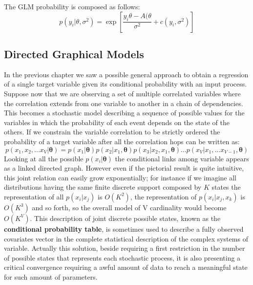 The GLM probability is composed as follows:
\begin{equation}
    p(y_i| \theta, \sigma^2) = 
    \exp{\left[ \frac{y_i\theta - A(\theta}{\sigma^2} + c(y_i,\sigma^2) \right] }
\end{equation}


%
%




\subsection{Directed Graphical Models}
In the previous chapter we saw a possible general approach to obtain a regression of a single target variable given its conditional probability with an input process. Suppose now that we are observing a set of multiple correlated variables where the correlation extends from one variable to another in a chain of dependencies. This becomes a stochastic model describing a sequence of possible values for the variables in which the probability of each event depends on the state of the others.
If we constrain the variable correlation to be strictly ordered the probability of a target variable after all the correlation hops can be written as:
\begin{equation}
    p(x_1, x_2, ... x_V | \bm{\theta}) = p(x_1|\bm{\theta})p(x_2|x_1,\bm{\theta})p(x_3|x_2,x_1,\bm{\theta}) ... p(x_V|x_1, ... x_{V-1},\bm{\theta})
\end{equation}
Looking at all the possible $p(x_i|\bm{\theta})$ the conditional links among variable appears as a linked directed graph.
However even if the pictorial result is quite intuitive, this joint relation can easily grow exponentially; for instance if we imagine all distributions having the same finite discrete support composed by $K$ states the representation of all $p(x_i|x_j)$ is $O(K^2)$, the representation of $p(x_i|x_j,x_k)$ is $O(K^3)$ and so forth, so the overall model of V cardinality would become $O(K^V)$. This description of joint discrete possible states, known as the \textbf{conditional probability table}, is sometimes used to describe a fully observed covariates vector in the complete statistical description of the complex systems of variable. Actually this solution, beside requiring a first restriction in the number of possible states that represents each stochastic process, it is also presenting a critical convergence requiring a awful amount of data to reach a meaningful state for such amount of parameters.
